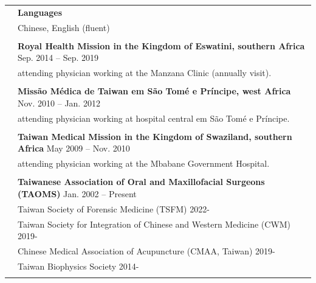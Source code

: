\documentclass[letterpaper, 11pt]{article}
\begin{document}
\begin{longtable}{p{1.3in}p{4.8in}}
& \textbf{Languages} \\
& Chinese, English (fluent) \\
& \\


\color{OliveGreen}{Service and outreach by TMU} %
& \textbf{Royal Health Mission in the Kingdom of Eswatini, southern Africa} \hfill Sep. 2014 -- Sep. 2019 \\
& attending physician working at the Manzana Clinic (annually visit). \\
& \\

& \textbf{Missão Médica de Taiwan em São Tomé e Príncipe, west Africa} \hfill Nov. 2010 -- Jan. 2012 \\
& attending physician working at hospital central em São Tomé e Príncipe. \\
& \\

& \textbf{Taiwan Medical Mission in the Kingdom of Swaziland, southern Africa} \hfill May 2009 -- Nov. 2010 \\
& attending physician working at the Mbabane Government Hospital. \\
& \\


\nohyphens{\color{OliveGreen}{Professional memberships}}
& {\textbf{Taiwanese Association of Oral and Maxillofacial Surgeons (TAOMS)}} \hfill Jan. 2002 -- Present \\
& Taiwan Society of Forensic Medicine (TSFM) \hfill 2022-\\ 
& Taiwan Society for Integration of Chinese and Western Medicine (CWM) \hfill 2019-\\
& Chinese Medical Association of Acupuncture (CMAA, Taiwan) \hfill 2019- \\
& Taiwan Biophysics Society \hfill 2014-\\ 
& \\




\end{longtable}
\end{document}
